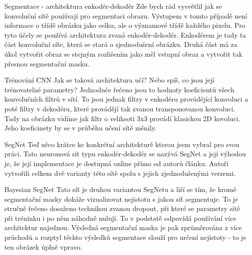 \documentclass[aspectratio=1610]{beamer}
\begin{document}
\begin{frame}{Segmentace - architektura enkodér-dekodér}
Zde bych rád vysvětlil jak se konvoluční sítě používají pro segmentaci obrazu. Výstupem v tomto případě není informace o třídě obrázku jako celku, ale o významové třídě každého pixelu. Pro tyto účely se používá architektura zvaná enkodér-dekodér. Enkodérem je tady ta část konvoluční síťe, která se stará o zjednodušení obrázku. Druhá část má za úkol vytvořit obraz se stejným rozlišením jako měl vstupní obraz a vytvořit tak přesnou segmentační masku. 
\end{frame}
\begin{frame}{Trénování CNN}
Jak se taková architektura učí? Nebo spíš, co jsou její trénovatelné parametry? Jednoduče řečeno jsou to hodnoty koeficientů všech konvolučních filtrů v sítí. To jsou jednak filtry v enkodéru provádějící konvoluci a poté filtry v dekodéru, které provádějí tak zvanou transponovanou konvoluci. Tady na obrázku vidíme jak filtr o veliksoti 3x3 provádí klasickou 2D kovoluci. Jeho koeficinety by se v průběhu učení sítě měnily.
\end{frame}
\begin{frame}{SegNet}
Teď něco krátce ke konkrétní architekturě kterou jsem vybral pro svou práci. Tato neuronová sít typu enkodér-dekodér se nazývá SegNet a její výhodou je, že její implementace je dostupná online přímo od autorů článku. Autoři vytvořili celkem dvě varianty této sítě spolu s jejich zjednodušenými verzemi.
\end{frame}
\begin{frame}{Bayesian SegNet}
Tato síť je druhou variantou SegNetu a liší se tím, že kromě segmentační masky dokáže vizualizovat nejistotu s jakou síť segmentuje. To je stručně řečeno dosaženo technikou zvanou dropout, při které se parametry sítě při tréninku i po něm náhodně nulují. To v podstatě odpovídá používání více architektur najednou. Výsledná segmentační maska je pak zprůměrována z více průchodů a rozptyl těchto výsledků segmentace slouží pro určení nejistoty - to je ten obrázek úplně vpravo.
\end{frame}
\end{document}
